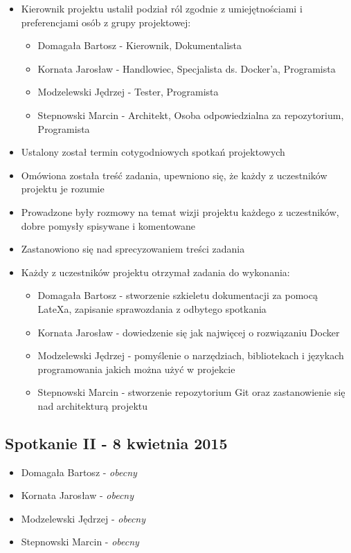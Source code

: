 \begin{itemize}
\item Kierownik projektu ustalił podział ról zgodnie z umiejętnościami i preferencjami osób z grupy projektowej:

\begin{itemize}
\item Domagała Bartosz - Kierownik, Dokumentalista
\item Kornata Jarosław - Handlowiec, Specjalista ds. Docker'a, Programista
\item Modzelewski Jędrzej - Tester, Programista
\item Stepnowski Marcin - Architekt, Osoba odpowiedzialna za repozytorium, Programista
\end{itemize}

\item Ustalony został termin cotygodniowych spotkań projektowych
\item Omówiona została treść zadania, upewniono się, że każdy z uczestników projektu je rozumie
\item Prowadzone były rozmowy na temat wizji projektu każdego z uczestników, dobre pomysły spisywane i komentowane
\item Zastanowiono się nad sprecyzowaniem treści zadania
\item Każdy z uczestników projektu otrzymał zadania do wykonania:
\begin{itemize}
\item Domagała Bartosz - stworzenie szkieletu dokumentacji za pomocą LateXa, zapisanie sprawozdania z odbytego spotkania
\item Kornata Jarosław - dowiedzenie się jak najwięcej o rozwiązaniu Docker
\item Modzelewski Jędrzej - pomyślenie o narzędziach, bibliotekach i językach programowania jakich można użyć w projekcie
\item Stepnowski Marcin - stworzenie repozytorium Git oraz zastanowienie się nad architekturą projektu
\end{itemize}
\end{itemize}

\subsection[Spotkanie II - 8 kwietnia 2015]{Spotkanie II - 8 kwietnia 2015}

\begin{itemize}
\item Domagała Bartosz - \textit{obecny}
\item Kornata Jarosław - \textit{obecny}
\item Modzelewski Jędrzej - \textit{obecny}
\item Stepnowski Marcin - \textit{obecny}
\end{itemize}

